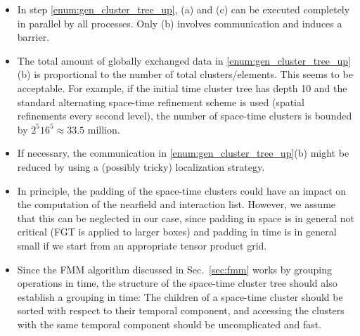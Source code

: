 \documentclass[a4paper,11pt]{article}
\theoremstyle{plain}
\theoremstyle{definition}
\theoremstyle{remark}
\begin{document}
\begin{itemize}
  \item In step \ref{enum:gen_cluster_tree_up}, (a) and (c) can be executed completely in parallel by all processes. Only (b) involves communication and induces a barrier.
  \item The total amount of globally exchanged data in \ref{enum:gen_cluster_tree_up}(b) is proportional to the number of total clusters/elements. This seems to be acceptable. For example, if the initial time cluster tree has depth 10 and the standard alternating space-time refinement scheme is used (spatial refinements every second level), the number of space-time clusters is bounded by $2^5 16^5 \approx 33.5$ million. 
  \item If necessary, the communication in \ref{enum:gen_cluster_tree_up}(b) might be reduced by using a (possibly tricky) localization strategy.
  \item In principle, the padding of the space-time clusters could have an impact on the computation of the nearfield and interaction list. However, we assume that this can be neglected in our case, since padding in space is in general not critical (FGT is applied to larger boxes) and padding in time is in general small if we start from an appropriate tensor product grid.
  \item Since the FMM algorithm discussed in Sec.~\ref{sec:fmm} works by grouping operations in time, the structure of the space-time cluster tree should also establish a grouping in time: The children of a space-time cluster should be sorted with respect to their temporal component, and accessing the clusters with the same temporal component should be uncomplicated and fast.
\end{itemize}
\end{document}

